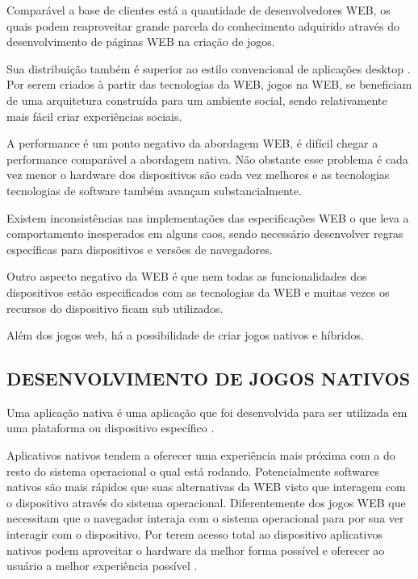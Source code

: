 Comparável a base de clientes está a quantidade de desenvolvedores
WEB, os quais podem reaproveitar grande parcela do conhecimento
adquirido através do desenvolvimento de páginas WEB na criação de
jogos.

Sua distribuição também é superior ao estilo convencional de
aplicações desktop \autocite{browserGamesTechnologyAndFuture}. 
Por serem criados à partir das tecnologias da WEB, jogos na WEB, se
beneficiam de uma arquitetura construída para um ambiente social, sendo
relativamente mais fácil criar experiências sociais.

A performance é um ponto negativo da abordagem WEB, é difícil
chegar a performance comparável a abordagem nativa. Não obstante
esse problema é cada vez menor o hardware dos dispositivos são cada
vez melhores e as tecnologias tecnologias de software também avançam
substancialmente.

Existem inconsistências nas implementações das especificações
WEB o que leva a comportamento inesperados em alguns caos, sendo
necessário desenvolver regras específicas para dispositivos e versões
de navegadores.

Outro aspecto negativo da WEB é que nem todas as funcionalidades dos
dispositivos estão especificados com as tecnologias da WEB e muitas
vezes os recursos do dispositivo ficam sub utilizados.

Além dos jogos web, há a possibilidade de criar jogos nativos e híbridos.

\subsection{DESENVOLVIMENTO DE JOGOS NATIVOS}

Uma aplicação nativa é uma aplicação que foi desenvolvida para ser
utilizada em uma plataforma ou dispositivo específico \autocite[pp.
7]{aSeriousContender}. 

Aplicativos nativos tendem a oferecer uma experiência mais próxima com
a do resto do sistema operacional o qual está rodando. Potencialmente
softwares nativos são mais rápidos que suas alternativas da WEB
visto que interagem com o dispositivo através do sistema operacional.
Diferentemente dos jogos WEB que necessitam que o navegador interaja com
o sistema operacional para por sua ver interagir com o dispositivo. Por
terem acesso total ao dispositivo aplicativos nativos podem aproveitar
o hardware da melhor forma possível e oferecer ao usuário a melhor
experiência possível \autocite[pp. 7]{aSeriousContender}.

